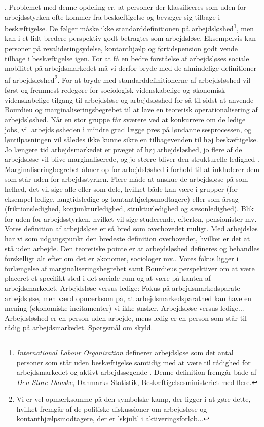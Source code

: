 \parencite{2015a}. Problemet med denne opdeling er, at personer der klassificeres som uden for arbejdsstyrken ofte kommer fra beskæftigelse og bevæger sig tilbage i beskæftigelse. De følger måske ikke standarddefinitionen på arbejdsløshed\footnote{\textit{International Labour Organization} definerer arbejdsløse som det antal personer som står uden beskæftigelse samtidig med at være til rådighed for arbejdsmarkedet og aktivt arbejdssøgende \parencite{ILO1982}. Denne definition fremgår både af \textit{Den Store Danske}, Danmarks Statistik, Beskæftigelsesministeriet med flere.}, men kan i et lidt bredere perspektiv godt betragtes som arbejdsløse. Eksempelvis kan personer på revalideringsydelse, kontanthjælp og førtidspension godt vende tilbage i beskæftigelse igen. For at få en bedre forståelse af arbejdsløses sociale mobilitet på arbejdsmarkedet må vi derfor bryde med de almindelige definitioner af arbejdsløshed\footnote{Vi er vel opmærksomme på den symbolske kamp, der ligger i at gøre dette, hvilket fremgår af de politiske diskussioner om arbejdsløse og kontanthjælpsmodtagere, der er ’skjult’ i aktiveringsforløb...}. For at bryde med standarddefinitionerne af arbejdsløshed vil først og fremmest redegøre for sociologisk-videnskabelige og økonomisk-videnskabelige tilgang til arbejdsløse og arbejdsløshed for så til sidst at anvende Bourdieu og marginaliseringsbegrebet til at lave en teoretisk operationalisering af arbejdsløshed. Når en stor gruppe får sværere ved at konkurrere om de ledige jobs, vil arbejdsløsheden i mindre grad lægge pres på løndannelsesprocessen, og løntilpasningen vil således ikke kunne sikre en tilbagevenden til høj beskæftigelse. Jo længere tid arbejdsmarkedet er præget af høj arbejdsløshed, jo flere af de arbejdsløse vil blive marginaliserede, og jo større bliver den strukturelle ledighed \parencite{2015}.  Marginaliseringbegrebet åbner op for arbejdsløshed i forhold til at inkluderer dem som står uden for arbejdsstyrken. Flere måde at anskue de arbejdsløse på som helhed, det vil sige alle eller som dele, hvilket både kan være i grupper (for eksempel ledige, langtidsledige og kontanthjælpsmodtagere) eller som årsag (friktionsledighed, konjunkturledighed, strukturledighed og sæsonledighed). Blik for uden for arbejdsstyrken, hvilket vil sige studerende, efterløn, pensionister mv. Vores definition af arbejdsløse er så bred som overhovedet muligt. Med arbejdsløs har vi som udgangspunkt den bredeste definition overhovedet, hvilket er det at stå uden arbejde. Den teoretiske pointe er at arbejdsløshed defineres og behandles forskelligt alt efter om det er økonomer, sociologer mv.. Vores fokus ligger i forlængelse af marginaliseringsbegrebet \parencite{Larsen2009} samt Bourdieus perspektiver om at være placeret et specifikt sted i det sociale rum og at være på kanten af arbejdsmarkedet. Arbejdsløse versus ledige: Fokus på arbejdsmarkedsparate arbejdsløse, men værd opmærksom på, at arbejdsmarkedsparathed kan have en mening (økonomiske incitamenter) vi ikke ønsker. Arbejdsløse versus ledige... Arbejdsløshed er en person uden arbejde, mens ledig er en person som står til rådig på arbejdsmarkedet. Spørgsmål om skyld.

